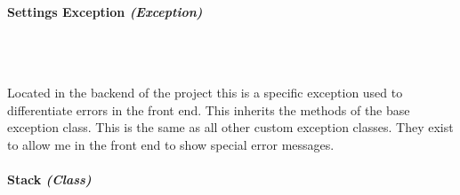 \begin{FlushLeft}
\paragraph{Settings Exception \textit{(Exception)}} \mbox{} \\

    \begin{figure}[H]
        \centering
    \end{figure}\\
    Located in the backend of the project this is a specific exception used to differentiate errors in the front end. This inherits the methods of the base exception class. This is the same as all other custom exception classes. They exist to allow me in the front end to show special error messages.
    \bk

    \pagebreak
\paragraph{Stack \textit{(Class)}} \mbox{} \\

    \begin{figure}[H]
        \centering
    \end{figure}\\

    \bk


\end{FlushLeft}
